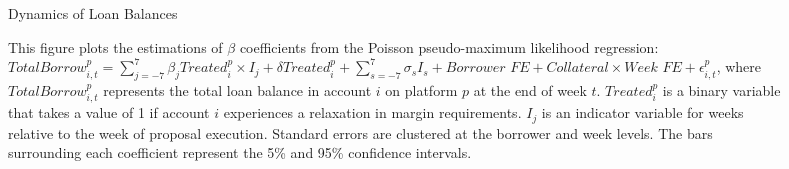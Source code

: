 \clearpage
\newpage
\begin{figure}[ht!]
\centering
\caption{Dynamics of Loan Balances}\label{fig:dynamics_borrow}
\caption*{This figure plots the estimations of $\beta$ coefficients from the Poisson pseudo-maximum likelihood regression: $TotalBorrow_{i,t}^p=\sum_{j=-7}^{7}\beta_jTreated_{i}^p\times I_j+\delta Treated_{i}^p+\sum_{s=-7}^{7}\sigma_sI_s+\textit{Borrower FE} + \textit{Collateral}\times\textit{Week FE}+\epsilon_{i,t}^p$, where $TotalBorrow_{i,t}^{p}$ represents the total loan balance in account $i$ on platform $p$ at the end of week $t$. $Treated_{i}^{p}$ is a binary variable that takes a value of 1 if account $i$ experiences a relaxation in margin requirements. $I_j$ is an indicator variable for weeks relative to the week of proposal execution. Standard errors are clustered at the borrower and week levels. The bars surrounding each coefficient represent the 5\% and 95\% confidence intervals.  }

\bigskip

\end{figure}

\clearpage
\newpage



